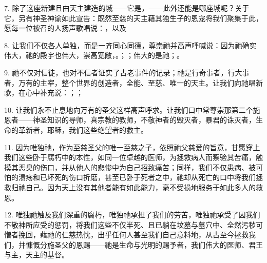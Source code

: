 7. 除了这座新建且由天主建造的城——它是，——此外还能是哪座城呢？关于它，另有神圣神谕如此宣告：既然至慈的天主藉其独生子的恩宠将我们聚集于此，愿每一位被召的人扬声歌唱说：，以及\par

8. 让我们不仅各人单独，而是一齐同心同德，尊崇祂并高声呼喊说：因为祂确实伟大，祂的殿宇也伟大，崇高宽敞，。；；伟大的是祂；。\par

9. 祂不仅对信徒，也对不信者证实了古老事件的记录；祂是行奇事者，行大事者，万有的主宰，整个世界的创造者，全能、至慈、唯一的天主。让我们向祂唱新歌，在心中补充说：；；\par

10. 让我们永不止息地向万有的圣父这样高声呼求。让我们口中常尊崇那第二个施恩者——神圣知识的导师，真宗教的教师，不敬神者的毁灭者，暴君的诛灭者，生命的革新者，耶稣，我们这些绝望者的救主。\par

11. 因为唯独祂，作为至慈圣父的唯一至慈之子，依照祂父慈爱的旨意，甘愿穿上我们这些卧于腐朽中的本性，如同一位卓越的医师，为拯救病人而察验其苦痛，触摸其恶臭的伤口，并从他人的悲惨中为自己招致痛苦；同样，我们不仅患病、被可怕的溃疡和已坏死的伤口折磨，甚至已卧于死者之中，祂却从死亡的口中将我们拯救归祂自己。因为天上没有其他者能有如此能力，毫不受损地服务于如此多人的救恩。\par

12. 唯独祂触及我们深重的腐朽，唯独祂承担了我们的劳苦，唯独祂承受了因我们不敬神所应受的惩罚，将我们这些不仅半死、且已躺在坟墓与墓穴中、全然污秽可憎者挽回，藉祂的仁慈热忱，出乎任何人甚至我们自己意料地，从古至今拯救我们，并慷慨分施圣父的恩赐——祂是生命与光明的赐予者，我们伟大的医师、君王与主，天主的基督。\par

